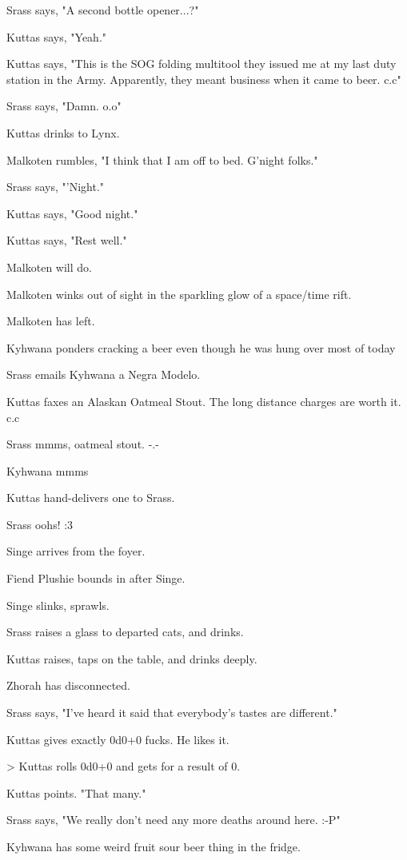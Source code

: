Srass says, "A second bottle opener...?"

Kuttas says, "Yeah."

Kuttas says, "This is the SOG folding multitool they issued me at my last duty station in the Army. Apparently, they meant business when it came to beer. c.c"

Srass says, "Damn. o.o"

Kuttas drinks to Lynx.

Malkoten rumbles, "I think that I am off to bed.  G'night folks."

Srass says, "'Night."

Kuttas says, "Good night."

Kuttas says, "Rest well."

Malkoten will do.

Malkoten winks out of sight in the sparkling glow of a space/time rift.

Malkoten has left.

Kyhwana ponders cracking a beer even though he was hung over most of today

Srass emails Kyhwana a Negra Modelo.

Kuttas faxes an Alaskan Oatmeal Stout. The long distance charges are worth it. c.c

Srass mmms, oatmeal stout. -.-

Kyhwana mmms

Kuttas hand-delivers one to Srass.

Srass oohs! :3

Singe arrives from the foyer.

Fiend Plushie bounds in after Singe.

Singe slinks, sprawls.

Srass raises a glass to departed cats, and drinks.

Kuttas raises, taps on the table, and drinks deeply.

Zhorah has disconnected.

Srass says, "I've heard it said that everybody's tastes are different."

Kuttas gives exactly 0d0+0 fucks. He likes it.

> Kuttas rolls 0d0+0 and gets for a result of 0.

Kuttas points. "That many."

Srass says, "We really don't need any more deaths around here. :-P"

Kyhwana has some weird fruit sour beer thing in the fridge.


